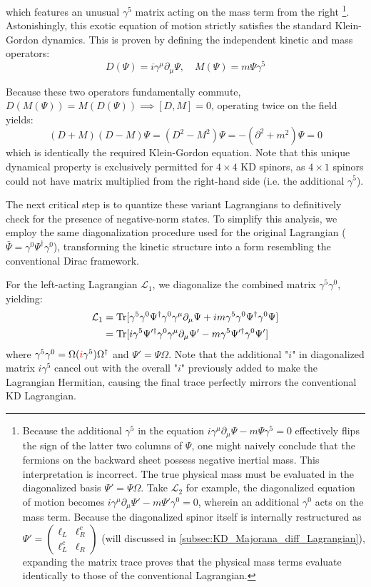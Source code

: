 which features an unusual $\gamma^5$ matrix acting on the mass term from the right \footnote{Because the additional $\gamma^5$ in the equation $i\gamma^\mu\partial_\mu\Psi-m\Psi\gamma^5=0$ effectively flips the sign of the latter two columns of $\Psi$, one might naively conclude that the fermions on the backward sheet possess negative inertial mass. This interpretation is incorrect. The true physical mass must be evaluated in the diagonalized basis $\Psi'=\Psi\Omega$. Take $\mathcal{L}_2$ for example, the diagonalized equation of motion becomes $i\gamma^\mu\partial_\mu\Psi'-m\Psi'\gamma^0=0$, wherein an additional $\gamma^0$ acts on the mass term. Because the diagonalized spinor itself is internally restructured as $\Psi'=\begin{pmatrix}\ell_L& \ell_R^c\\ \ell_L^c & \ell_R  \end{pmatrix}$ (will discussed in \cref{subsec:KD_Majorana_diff_Lagrangian}), expanding the matrix trace proves that the physical mass terms evaluate identically to those of the conventional Lagrangian.}. Astonishingly, this exotic equation of motion strictly satisfies the standard Klein-Gordon dynamics. This is proven by defining the independent kinetic and mass operators:
\[ D(\Psi)=i\gamma^\mu \partial_\mu\Psi,\quad M(\Psi)=m\Psi\gamma^5\]

Because these two operators fundamentally commute, $D(M(\Psi))=M(D(\Psi)) \implies [D,M]=0$, operating twice on the field yields: 
\begin{equation}
    (D+M)(D-M)\Psi=(D^2-M^2)\Psi=-(\partial^2+m^2)\Psi=0
\end{equation}
which is identically the required Klein-Gordon equation. Note that this unique dynamical property is exclusively permitted for $4\times 4$ KD spinors, as $4\times 1$ spinors could not  have matrix multiplied from the right-hand side (i.e. the additional $\gamma^5$).

The next critical step is to quantize these variant Lagrangians to definitively check for the presence of negative-norm states. To simplify this analysis, we employ the same diagonalization procedure used for the original Lagrangian ($\bar\Psi=\gamma^0\Psi^\dagger\gamma^0$), transforming the kinetic structure into a form resembling the conventional Dirac framework. 

For the left-acting Lagrangian $\mathcal{L}_1$, we diagonalize the combined matrix $\gamma^5\gamma^0$, yielding: 
\begin{equation}
\begin{aligned}
    \mathcal{L}_1&={\rm Tr}[ \gamma^5\gamma^0\Psi^\dagger\gamma^0\gamma^\mu\partial_\mu\Psi+im\gamma^5\gamma^0\Psi^\dagger\gamma^0\Psi]\\
    &={\rm Tr}[ i\gamma^5\Psi'^\dagger\gamma^0\gamma^\mu\partial_\mu\Psi'-m\gamma^5\Psi'^\dagger\gamma^0\Psi']
\end{aligned}
\end{equation}
where $\gamma^5\gamma^0=\Omega(\textcolor{red}{i}\gamma^5)\Omega^\dagger$ and $\Psi'=\Psi\Omega$. Note that the additional "$i$" in diagonalized matrix $i\gamma^5$ cancel out with the overall "$i$" previously added to make the Lagrangian Hermitian, causing the final trace perfectly mirrors the conventional KD Lagrangian.

